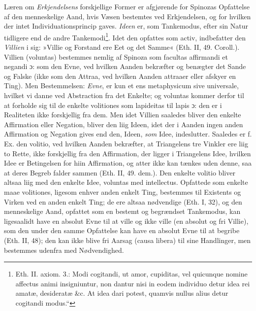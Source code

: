 \documentclass[12pt,a4paper]{book}
\newcommand{\opage}[1]{\marginnote{\footnotesize\textit{[#1]}}}
\begin{document}
Læren om \emph{Erkjendelsens} forskjellige Former er afgjørende for
Spinozas Opfattelse af den menneskelige Aand,
\opage{105} \setcounter{footnote}{0}%
hvis Væsen bestemtes ved Erkjendelsen, og for hvilken der intet
Individuationsprincip gaves. \emph{Ideen} er, som Tankemodus, efter sin
Natur tidligere end de andre Tankemodi\footnote{Eth. II. axiom. 3.:
Modi cogitandi, ut amor, cupiditas, vel quicunque nomine affectus
animi insigniuntur, non dantur nisi in eodem individuo detur idea
rei amatæ, desideratæ \&c. At idea dari potest, quamvis nullus alius
detur cogitandi modus.“}. Idet den opfattes som activ, indbefatter
den \emph{Villien} i sig: »Villie og Forstand ere Eet og det Samme«
(Eth. II, 49. Coroll.). Villien (voluntas) bestemmes nemlig af
Spinoza som facultas affirmandi et negandi ɔ: som den Evne, ved
hvilken Aanden bekræfter og benægter det Sande og Falske (ikke som
den Attraa, ved hvilken Aanden attraaer eller afskyer en Ting). Men
Bestemmelsen: \emph{Evne}, er kun et ens metaphysicum sive universale,
hvilket vi danne ved Abstraction fra det Enkelte; og voluntas kommer
derfor til at forholde sig til de enkelte volitiones som lapideitas
til lapis ɔ: den er i Realiteten ikke forskjellig fra dem. Men idet
Villien saaledes bliver den enkelte Affirmation eller Negation,
bliver den liig Ideen, idet der i Aanden ingen anden Affirmation og
Negation gives end den, Ideen, \emph{som} Idee, indeslutter. Saaledes er f.
Ex. den volitio, ved hvilken Aanden bekræfter, at Triangelens tre
Vinkler ere liig to Rette, ikke forskjellig fra den Affirmation, der
ligger i Triangelens Idee, hvilken Idee er Betingelsen for hiin
Affirmation, og atter ikke kan tænkes uden denne, saa at deres
Begreb falder sammen (Eth. II, 49. dem.). Den enkelte volitio bliver
altsaa liig med den enkelte Idee, voluntas med intellectus.
Opfattede som enkelte maae volitiones, ligesom enhver anden enkelt
Ting, bestemmes til Existents og Virken ved en anden enkelt Ting; de
ere altsaa nødvendige (Eth. I, 32), og den menneskelige Aand,
opfattet som en bestemt og begrændset Tankemodus, kan ligesaalidt
have en absolut Evne til at ville og ikke ville (en absolut og fri
Villie), som den under den samme Opfattelse kan have en absolut Evne
til at begribe (Eth. II, 48); den kan ikke blive fri Aarsag
\opage{106} \setcounter{footnote}{0}%
(causa libera) til sine Handlinger, men bestemmes udenfra med
Nødvendighed.
\end{document}
